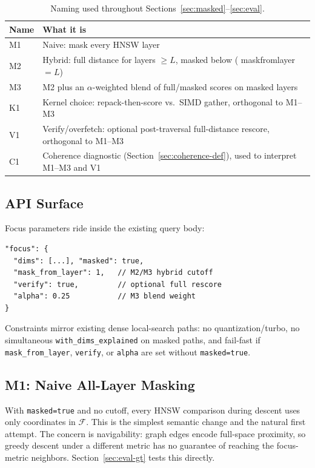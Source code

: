 \documentclass[sigconf,review,balance=false]{acmart}
\newcommand{\breakablecode}[1]{%
  {\ttfamily
    \renewcommand{\_}{\textunderscore\allowbreak}%
    #1%
  }}
\begin{document}
\begin{table}[htbp]
  \centering
  \caption{Naming used throughout Sections~\ref{sec:masked}--\ref{sec:eval}.}
  \label{tab:namemap}
  \small
  \begin{tabular}{@{}lp{6.4cm}@{}}
    \hline
    \textbf{Name} & \textbf{What it is} \\
    \hline
    M1 & Naive: mask every HNSW layer \\
    M2 & Hybrid: full distance for layers $\geq L$, masked below (\breakablecode{mask\_from\_layer}$=L$) \\
    M3 & M2 plus an $\alpha$-weighted blend of full/masked scores on masked layers \\
    \hline
    K1 & Kernel choice: repack-then-score vs.\ SIMD gather, orthogonal to M1--M3 \\
    V1 & Verify/overfetch: optional post-traversal full-distance rescore, orthogonal to M1--M3 \\
    C1 & Coherence diagnostic (Section~\ref{sec:coherence-def}), used to interpret M1--M3 and V1 \\
    \hline
  \end{tabular}
\end{table}

\subsection{API Surface}

Focus parameters ride inside the existing query body:
\begin{verbatim}
"focus": {
  "dims": [...], "masked": true,
  "mask_from_layer": 1,   // M2/M3 hybrid cutoff
  "verify": true,         // optional full rescore
  "alpha": 0.25           // M3 blend weight
}
\end{verbatim}
Constraints mirror existing dense local-search paths: no quantization/turbo, no
simultaneous \texttt{with\_dims\_explained} on masked paths, and fail-fast if
\texttt{mask\_from\_layer}, \texttt{verify}, or \texttt{alpha} are set without
\texttt{masked=true}.

\subsection{M1: Naive All-Layer Masking}

With \texttt{masked=true} and no cutoff, every HNSW comparison during descent
uses only coordinates in $\mathcal{F}$. This is the simplest semantic change
and the natural first attempt. The concern is navigability: graph edges encode
full-space proximity, so greedy descent under a different metric has no
guarantee of reaching the focus-metric neighbors. Section~\ref{sec:eval-gt}
tests this directly.
\end{document}
